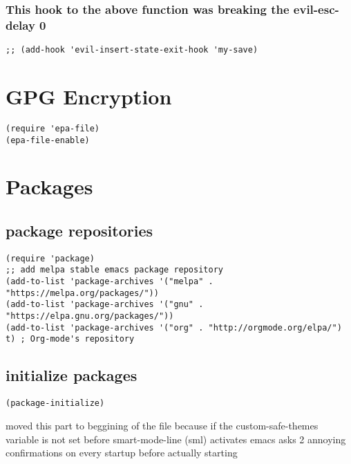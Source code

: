 \documentclass[11pt]{article}
\begin{document}
\subsubsection*{This hook to the above function was breaking the evil-esc-delay 0}
\label{sec:org698b094}
\begin{verbatim}
;; (add-hook 'evil-insert-state-exit-hook 'my-save)
\end{verbatim}



\section*{GPG Encryption}
\label{sec:org5510d5d}

\begin{verbatim}
(require 'epa-file)
(epa-file-enable)
\end{verbatim}


\section*{Packages}
\label{sec:org94f182c}
\subsection*{package repositories}
\label{sec:org32d2d58}

\begin{verbatim}
(require 'package)
;; add melpa stable emacs package repository
(add-to-list 'package-archives '("melpa" . "https://melpa.org/packages/"))
(add-to-list 'package-archives '("gnu" . "https://elpa.gnu.org/packages/"))
(add-to-list 'package-archives '("org" . "http://orgmode.org/elpa/") t) ; Org-mode's repository
\end{verbatim}

\subsection*{initialize packages}
\label{sec:org7c52bae}
\begin{verbatim}
(package-initialize)
\end{verbatim}

moved this part to beggining of the file because if the
custom-safe-themes variable is not set before smart-mode-line (sml) activates
emacs asks 2 annoying confirmations on every startup before actually starting
\end{document}
